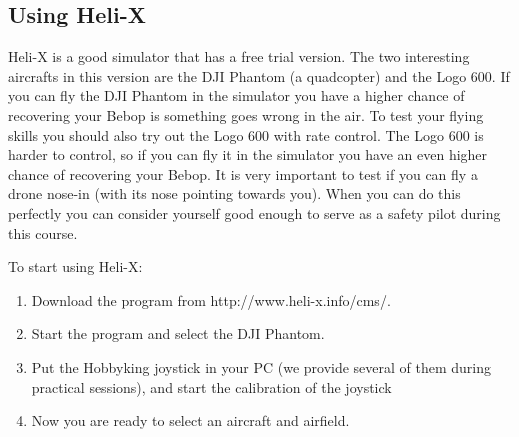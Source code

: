 \documentclass{article}
\begin{document}
\subsection*{Using Heli-X}
Heli-X is a good simulator that has a free trial version. The two interesting aircrafts in this version are the DJI Phantom (a quadcopter) and the Logo 600. If you can fly the DJI Phantom in the simulator you have a higher chance of recovering your Bebop is something goes wrong in the air. To test your flying skills you should also try out the Logo 600 with rate control. The Logo 600 is harder to control, so if you can fly it in the simulator you have an even higher chance of recovering your Bebop. It is very important to test if you can fly a drone nose-in (with its nose pointing towards you). When you can do this perfectly you can consider yourself good enough to serve as a safety pilot during this course. 
 
To start using Heli-X:
\begin{enumerate}
\item Download the program from http://www.heli-x.info/cms/. 
\item Start the program and select the DJI Phantom.
\item Put the Hobbyking joystick in your PC (we provide several of them during practical sessions), and start the calibration of the joystick
\item Now you are ready to select an aircraft and airfield. 
\end{enumerate}
\end{document}
